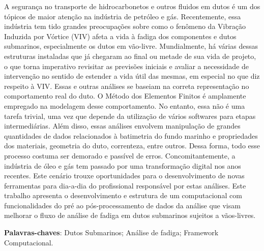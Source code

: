 
\setlength{\absparsep}{18pt} %
\begin{resumo}

    A segurança no transporte de hidrocarbonetos e outros fluidos em dutos é um dos tópicos de maior atenção na indústria de petróleo e gás.
    Recentemente, essa indústria tem tido grandes preocupações sobre como o fenômeno da Vibração Induzida por Vórtice (VIV) afeta a vida à fadiga dos componentes e dutos submarinos, especialmente os dutos em vão-livre. %
    Mundialmente, há várias dessas estruturas instaladas que já chegaram ao final ou metade de sua vida de projeto, o que torna imperativo revisitar as previsões iniciais e avaliar a necessidade de intervenção no sentido de estender a vida útil das mesmas, em especial no que diz respeito à VIV.
    Essas e outras análises se baseiam na correta representação no comportamento real do duto.
    O Método dos Elementos Finitos é amplamente empregado na modelagem desse comportamento.
    No entanto, essa não é uma tarefa trivial, uma vez que depende da utilização de vários softwares para etapas intermediárias.
    Além disso, essas análises envolvem manipulação de grandes quantidades de dados relacionados à batimetria do fundo marinho e propriedades dos materiais, geometria do duto, correnteza, entre outros.
    Dessa forma, todo esse processo costuma ser demorado e passível de erros.
    Concomitantemente, a indústria de óleo e gás tem passado por uma transformação digital nos anos recentes.
    Este cenário trouxe oportunidades para o desenvolvimento de novas ferramentas para dia-a-dia do profissional responsável por estas análises.
    Este trabalho apresenta o desenvolvimento e estrutura de um \frame computacional com funcionalidades do pré ao pós-processamento de dados da análise que visam melhorar o fluxo de análise de fadiga em dutos submarinos sujeitos a vãos-livres.

 \textbf{Palavras-chaves}: Dutos Submarinos; Análise de fadiga; Framework Computacional.
\end{resumo}

